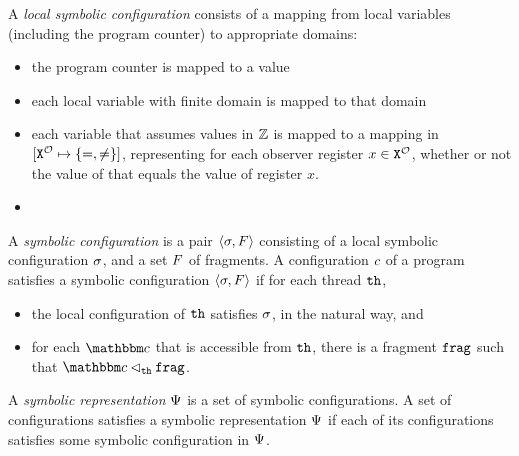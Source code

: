 A {\em local symbolic configuration} consists of a mapping from local variables
(including the program counter) to appropriate domains:
\begin{itemize}
\item the program counter is mapped to a value
\item each local variable with finite domain is mapped to that domain
\item each variable that assumes values in ${\mathbb Z}$ is mapped to
  a mapping in  $[{\tt X}^{{\mathcal O}} \mapsto{\left\{=,\neq\right\}}]$, representing for
  each observer register $x  \in {\tt X}^{{\mathcal O}}$, whether or not the value
  of that equals the value of register $x$.
\item {}
\end{itemize}
A {\em symbolic configuration} is a pair
$\left\langle\sigma,F\right\rangle$ consisting of a local symbolic 
configuration $\sigma$, and a set $F$ of fragments.
A configuration $c$ of a program satisfies a symbolic configuration
$\left\langle\sigma,F\right\rangle$ if for each thread ${\tt th}$,
\begin{itemize}
\item the local configuration of ${\tt th}$ satisfies $\sigma$, in the
  natural way, and
\item for each $\cell$ that is accessible from ${\tt th}$, there is
  a fragment $\mathtt{frag}$ such that $\cell \lhd_{\thread} \frag$.
\end{itemize}


A {\em symbolic representation} $\Psi$ is a set of
symbolic configurations. 
A  set of configurations satisfies a symbolic
representation $\Psi$ if each of its
configurations satisfies some symbolic configuration in $\Psi$.

